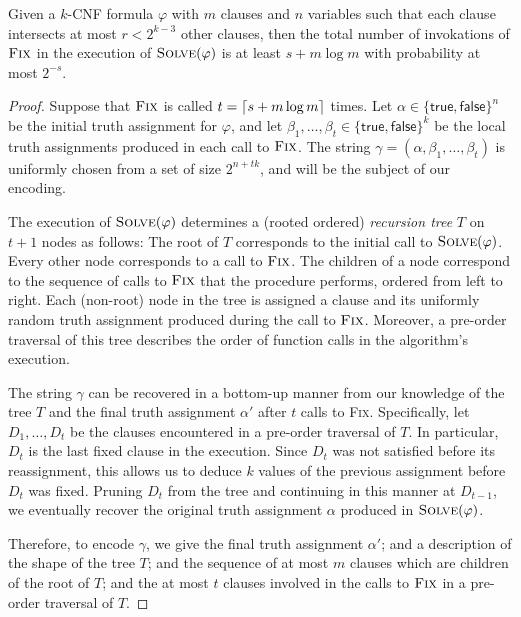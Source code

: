 \documentclass[format=acmsmall, review=false, screen=true]{acmart}
\begin{document}
\begin{thm}
%
  Given a $k$-CNF formula $\varphi$ with $m$ clauses and $n$ variables
  such that each clause intersects at most $r < 2^{k - 3}$ other
  clauses, then the total number of invokations of $\textsc{Fix}$ in
  the execution of $\textsc{Solve}(\varphi)$ is at least
  $s + m \log m$ with probability at most $2^{-s}$.
\end{thm}
\begin{proof}
  Suppose that $\textsc{Fix}$ is called 
  $t = {\lceil s + m\log m \rceil}$ times. Let
  $\alpha \in \{\textsf{true}, \textsf{false}\}^n$ be the initial
  truth assignment for $\varphi$, and let
  $\beta_1, \ldots, \beta_t \in \{\textsf{true}, \textsf{false}\}^k$
  be the local truth assignments produced in each call to
  $\textsc{Fix}$. The string
  $\gamma = (\alpha, \beta_1, \ldots, \beta_t)$ is uniformly chosen
  from a set of size $2^{n + tk}$, and will be the subject of our
  encoding.

  The execution of $\textsc{Solve}(\varphi)$ determines a (rooted
  ordered) \emph{recursion tree} $T$ on $t + 1$ nodes as follows: The
  root of $T$ corresponds to the initial call to
  $\textsc{Solve}(\varphi)$. Every other node corresponds to a call
  to $\textsc{Fix}$. The children of a node correspond 
   to the sequence of calls to $\textsc{Fix}$ that the procedure
  performs, ordered from left to right.
  Each (non-root) node in the tree is assigned a clause
  and its uniformly random truth assignment produced during the call
  to $\textsc{Fix}$. Moreover, a pre-order traversal of this tree
  describes the order of function calls in the algorithm's execution.

  The string $\gamma$ can be recovered in a bottom-up manner from our
  knowledge of the tree $T$ and the final truth assignment
  $\alpha'$ after $t$ calls to \textsc{Fix}. 
  Specifically, let $D_1, \dots, D_t$ be the clauses
  encountered in a pre-order traversal of $T$. In particular, $D_t$ is
  the last fixed clause in the execution. Since $D_t$ was not
  satisfied before its reassignment, this allows us to deduce $k$
  values of the previous assignment
  before $D_t$ was fixed. Pruning $D_t$ from the tree and continuing
  in this manner at $D_{t - 1}$, we eventually recover the original
  truth assignment $\alpha$ produced in $\textsc{Solve}(\varphi)$.

  Therefore, to encode $\gamma$, we give the final truth
  assignment $\alpha'$; and a description of the shape of the tree
  $T$; and the sequence of at most $m$ clauses which are children of
  the root of $T$; and the at most $t$ clauses involved in the calls
  to $\textsc{Fix}$ in a pre-order traversal of $T$.  


\end{proof}
\end{document}
